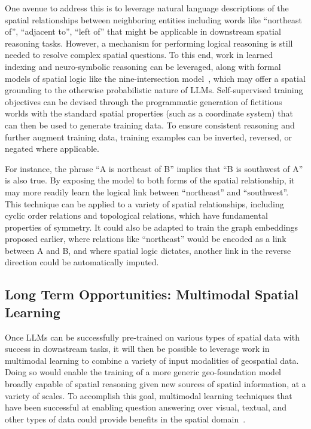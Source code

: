 One avenue to address this is to leverage natural language descriptions of the spatial relationships between neighboring entities including words like ``northeast of'', ``adjacent to'', ``left of'' that might be applicable in downstream spatial reasoning tasks.
%
%
However, a mechanism for performing logical reasoning is still needed to resolve complex spatial questions.
To this end, work in learned indexing and neuro-symbolic reasoning can be leveraged, along with formal models of spatial logic like the nine-intersection model~\cite{Strobl2008}, which may offer a spatial grounding to the otherwise probabilistic nature of LLMs.
Self-supervised training objectives can be devised through the programmatic generation of fictitious worlds with the standard spatial properties (such as a coordinate system) that can then be used to generate training data.
To ensure consistent reasoning and further augment training data, training examples can be inverted, reversed, or negated where applicable.

For instance, the phrase ``A is northeast of B'' implies that ``B is southwest of A'' is also true.
By exposing the model to both forms of the spatial relationship, it may more readily learn the logical link between ``northeast'' and ``southwest''.
This technique can be applied to a variety of spatial relationships, including cyclic order relations and topological relations, which have fundamental properties of symmetry.
It could also be adapted to train the graph embeddings proposed earlier, where relations like ``northeast'' would be encoded as a link between A and B, and where spatial logic dictates, another link in the reverse direction could be automatically imputed.




\subsection{Long Term Opportunities: Multimodal Spatial Learning}
Once LLMs can be successfully pre-trained on various types of spatial data with success in downstream tasks, it will then be possible to leverage work in multimodal learning to combine a variety of input modalities of geospatial data.
Doing so would enable the training of a more generic geo-foundation model broadly capable of spatial reasoning given new sources of spatial information, at a variety of scales.
To accomplish this goal, multimodal learning techniques that have been successful at enabling question answering over visual, textual, and other types of data could provide benefits in the spatial domain~\cite{Fei2022}.

